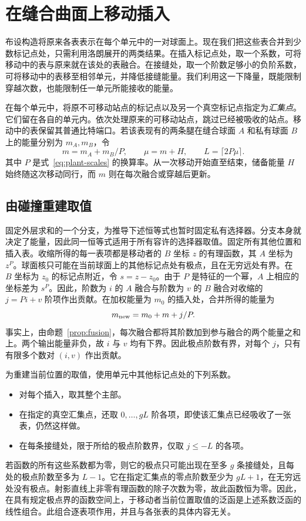 \section{在缝合曲面上移动插入}\label{subsec:motion}

布设构造将原来各表表示在每个单元中的一对球面上。现在我们把这些表合并到少数标记点处，只需利用洛朗展开的两类结果。在插入标记点处，取一个系数，可将移动中的表与原来就在该处的表融合。在接缝处，取一个阶数足够小的负阶系数，可将移动中的表移至相邻单元，并降低接缝能量。我们利用这一下降量，既能限制穿越次数，也能限制任一单元所能接收的能量。

在每个单元中，将原不可移动站点的标记点以及另一个真空标记点指定为\emph{汇集点}。它们留在各自的单元内。依次处理原来的可移动站点，跳过已经被吸收的站点。移动中的表保留其普通比特端口。若该表现有的两条腿在缝合球面 $A$ 和私有球面 $B$ 上的能量分别为 $m_A,m_B$，令 \[
       m=m_A+m_B/P,\qquad \mu=m+H,\qquad L=\lceil 2P\mu\rceil .
\] 其中 $P$ 是式~\eqref{eq:plant-scales} 的换算率。从一次移动开始直至结束，储备能量 $H$ 始终随这次移动同行，而 $m$ 则在每次融合或穿越后更新。

\subsection{由碰撞重建取值}

固定外层求和的一个分支，为推导下述恒等式也暂时固定私有选择器。分支本身就决定了能量，因此同一恒等式适用于所有容许的选择器取值。固定所有其他位置和插入表。收缩所得的每一表项都是移动者的 $B$ 坐标 $z$ 的有理函数，其 $A$ 坐标为 $z^P$。球面核只可能在当前球面上的其他标记点处有极点，且在无穷远处有界。在 $B$ 坐标为 $z_0$ 的标记点附近，令 $s=z-z_0$。由于 $P$ 是特征的一个幂，$A$ 上相应的坐标差为 $s^P$。因此，阶数为 $i$ 的 $A$ 融合与阶数为 $v$ 的 $B$ 融合对收缩的 $j=Pi+v$ 阶项作出贡献。在加权能量为 $m_0$ 的插入处，合并所得的能量为
\begin{equation}
            m_{\rm new}=m_0+m+j/P.                     \label{eq:motion-fusion}
\end{equation} 事实上，由命题~\ref{prop:fusion}，每次融合都将其阶数加到参与融合的两个能量之和上。两个输出能量非负，故 $i$ 与 $v$ 均有下界。因此极点阶数有界，对每个 $j$，只有有限多个数对 $(i,v)$ 作出贡献。

为重建当前位置的取值，使用单元中其他标记点处的下列系数。\begin{itemize}
\item 对每个插入，取其整个主部。\item 在指定的真空汇集点，还取 $0,\ldots,gL$ 阶各项，即使该汇集点已经吸收了一张表，仍然这样做。\item 在每条接缝处，限于所给的极点阶数界，仅取 $j\le -L$ 的各项。\end{itemize}
若函数的所有这些系数都为零，则它的极点只可能出现在至多 $g$ 条接缝处，且每处的极点阶数至多为 $L-1$。它在指定汇集点的零点阶数至少为 $gL+1$，在无穷远处没有极点。射影直线上非零有理函数的除子次数为零，故此函数恒为零。因此，在具有规定极点界的函数空间上，于移动者当前位置取值的泛函是上述系数泛函的线性组合。此组合逐表项作用，并且与各张表的具体内容无关。

